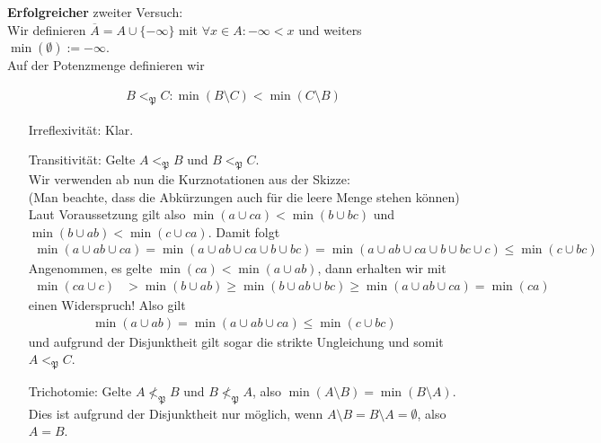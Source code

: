 \begin{solution}
\textbf{Erfolgreicher} zweiter Versuch: \\
Wir definieren $\overline{A} = A \cup \{-\infty\}$ mit $\forall x \in A: -\infty < x$
und weiters $\min(\emptyset) := -\infty$. \\
Auf der Potenzmenge definieren wir

\begin{align*}
  B <_\mathfrak{P} C :\min(B \setminus C) < \min(C \setminus B)
\end{align*}


\begin{center}
\def\r{1}
\def\R{1.3}
\end{center}

\begin{itemize}
  \item[Irreflexivität:] Klar.
  \item[Transitivität:] Gelte $A <_\mathfrak{P} B$ und $B <_\mathfrak{P} C$. \\
  Wir verwenden ab nun die Kurznotationen aus der Skizze: \\
  (Man beachte, dass die Abkürzungen auch für die leere Menge stehen können)\\
  Laut Voraussetzung gilt also $\min(a \cup ca) < \min(b \cup bc)$ und
  $\min(b \cup ab) < \min(c \cup ca)$. Damit folgt
  \begin{align*}
    \min(a \cup ab \cup ca) = \min(a \cup ab \cup ca \cup b \cup bc)
    = \min(a \cup ab \cup ca \cup b \cup bc \cup c) \leq \min(c \cup bc)
  \end{align*}
  Angenommen, es gelte $\min(ca) < \min(a \cup ab)$, dann erhalten wir mit
  \begin{align*}
  \min(ca \cup c) &> \min(b \cup ab) \geq \min(b \cup ab \cup bc) \geq \min(a \cup ab \cup ca)
  = \min(ca)
  \end{align*}
  einen Widerspruch! Also gilt
  \begin{align*}
    \min(a \cup ab) = \min(a \cup ab \cup ca) \leq \min(c \cup bc)
  \end{align*}
  und aufgrund der Disjunktheit gilt sogar die strikte Ungleichung und somit $A <_\mathfrak{P} C$.

  \item[Trichotomie:] Gelte $A \nless_\mathfrak{P} B$ und $B \nless_\mathfrak{P} A$, also
  $\min(A \setminus B) = \min(B \setminus A)$. Dies ist aufgrund der Disjunktheit nur
  möglich, wenn $A \setminus B = B \setminus A = \emptyset$, also $A = B$.
\end{itemize}

\end{solution}

